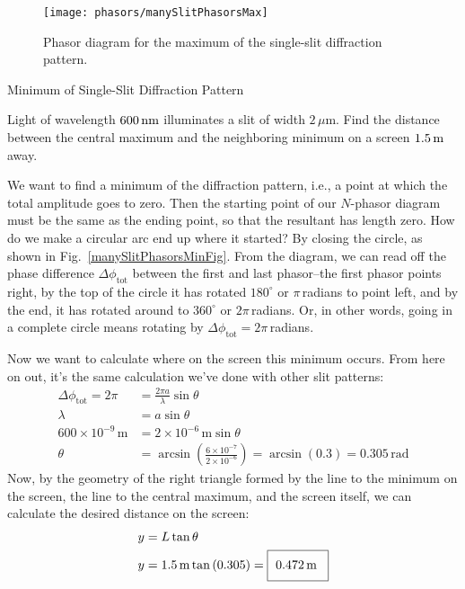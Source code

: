 \begin{figure}
\begin{center}
\texttt{[image: phasors/manySlitPhasorsMax]}
\end{center}
\caption{\label{manySlitPhasorsMaxFig}Phasor diagram for the maximum of the
single-slit diffraction pattern.}
\end{figure}




\begin{example}{Minimum of Single-Slit Diffraction Pattern}
\label{exampleSingleSlit}



Light of wavelength $600\,\mbox{nm}$ illuminates a slit of
width $2\,\mu$m. Find the distance between the central maximum and the
neighboring minimum on a screen $1.5\,\mbox{m}$ away.

\solution
We want to find a minimum of the diffraction
pattern, i.e., a point at which the total amplitude goes to zero.
Then the starting point of our $N$-phasor diagram must be the same as
the ending point, so that the resultant has length zero.  How do we
make a circular arc end up where it started?  By closing the circle,
as shown in Fig.~\ref{manySlitPhasorsMinFig}.  From the diagram, we can read off the phase
difference $\Delta\phi_\text{tot}$ between the first and last
phasor--the first phasor points right, by the top of the circle it has
rotated $180^\circ$ or $\pi$\,radians to point left, and by the end,
it has rotated around to $360^\circ$ or $2\pi$\,radians.  Or, in other words,
 going in
a complete circle means rotating by
$\Delta\phi_\text{tot}=2\pi$\,radians.

Now we want to calculate where on the screen  this minimum occurs.
 From here on out, it's
the same calculation we've done with other slit patterns:
\begin{align*} 
\Delta\phi_\text{tot}=2\pi&=\frac{2\pi
a}{\lambda}\sin\theta\\ 
\lambda &= a\sin\theta\\
600\times 10^{-9}\,\text{m} &= 2\times 10^{-6}\,\text{m} \sin\theta\\
\theta&=\arcsin \left(
\frac{6\times 10^{-7}}{2\times 10^{-6}} \right)
=  \arcsin \left(0.3\right) = 0.305\,\text{rad}
\end{align*}
Now, by the geometry of the right triangle formed by the line
to the minimum on the screen, the line to the central maximum, and the screen itself, we can calculate the desired distance on the screen:
\begin{align*}
y &= L \tan\theta \\ 
y&=1.5\,\text{m} \tan\left( 0.305 
\right)= \fbox{\,\,0.472\,m\phantom{\Big (}}
\end{align*}
\end{example}

